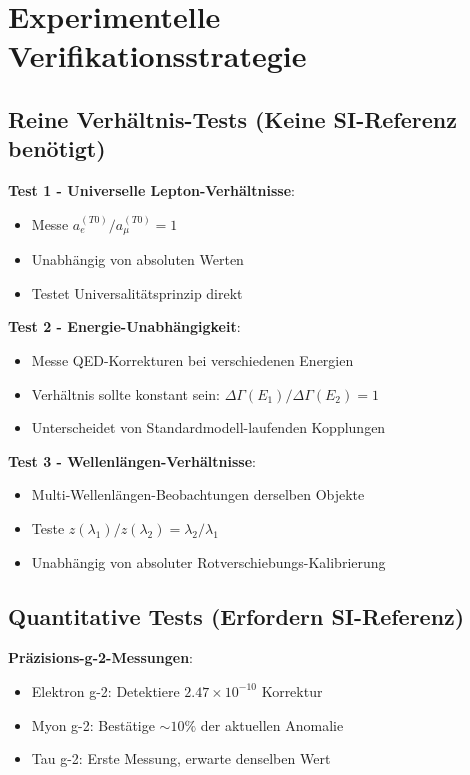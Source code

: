 \documentclass[12pt,a4paper]{article}
\theoremstyle{definition}
\theoremstyle{remark}
\begin{document}
	\section{Experimentelle Verifikationsstrategie}
	
	\subsection{Reine Verhältnis-Tests (Keine SI-Referenz benötigt)}
	
	\textbf{Test 1 - Universelle Lepton-Verhältnisse}:
	\begin{itemize}
		\item Messe $a_e^{(T0)}/a_{\mu}^{(T0)} = 1$
		\item Unabhängig von absoluten Werten
		\item Testet Universalitätsprinzip direkt
	\end{itemize}
	
	\textbf{Test 2 - Energie-Unabhängigkeit}:
	\begin{itemize}
		\item Messe QED-Korrekturen bei verschiedenen Energien
		\item Verhältnis sollte konstant sein: $\Delta\Gamma(E_1)/\Delta\Gamma(E_2) = 1$
		\item Unterscheidet von Standardmodell-laufenden Kopplungen
	\end{itemize}
	
	\textbf{Test 3 - Wellenlängen-Verhältnisse}:
	\begin{itemize}
		\item Multi-Wellenlängen-Beobachtungen derselben Objekte
		\item Teste $z(\lambda_1)/z(\lambda_2) = \lambda_2/\lambda_1$
		\item Unabhängig von absoluter Rotverschiebungs-Kalibrierung
	\end{itemize}
	
	\subsection{Quantitative Tests (Erfordern SI-Referenz)}
	
	\textbf{Präzisions-g-2-Messungen}:
	\begin{itemize}
		\item Elektron g-2: Detektiere $2.47 \times 10^{-10}$ Korrektur
		\item Myon g-2: Bestätige $\sim 10\%$ der aktuellen Anomalie
		\item Tau g-2: Erste Messung, erwarte denselben Wert
	\end{itemize}
	
\end{document}

